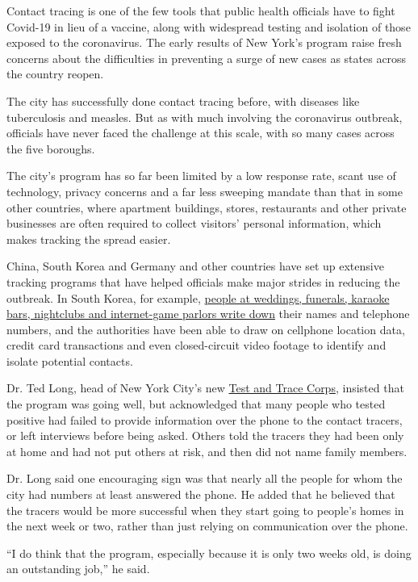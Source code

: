 Contact tracing is one of the few tools that public health officials
have to fight Covid-19 in lieu of a vaccine, along with widespread
testing and isolation of those exposed to the coronavirus. The early
results of New York's program raise fresh concerns about the
difficulties in preventing a surge of new cases as states across the
country reopen.

The city has successfully done contact tracing before, with diseases
like tuberculosis and measles. But as with much involving the
coronavirus outbreak, officials have never faced the challenge at this
scale, with so many cases across the five boroughs.

The city's program has so far been limited by a low response rate, scant
use of technology, privacy concerns and a far less sweeping mandate than
that in some other countries, where apartment buildings, stores,
restaurants and other private businesses are often required to collect
visitors' personal information, which makes tracking the spread easier.

China, South Korea and Germany and other countries have set up extensive
tracking programs that have helped officials make major strides in
reducing the outbreak. In South Korea, for example,
\href{https://www.nytimes3xbfgragh.onion/2020/05/09/world/asia/coronavirus-south-korea-second-wave.html}{people
at weddings, funerals, karaoke bars, nightclubs and internet-game
parlors write down} their names and telephone numbers, and the
authorities have been able to draw on cellphone location data, credit
card transactions and even closed-circuit video footage to identify and
isolate potential contacts.

Dr. Ted Long, head of New York City's new
\href{https://www.nychealthandhospitals.org/test-and-trace/}{Test and
Trace Corps}, insisted that the program was going well, but acknowledged
that many people who tested positive had failed to provide information
over the phone to the contact tracers, or left interviews before being
asked. Others told the tracers they had been only at home and had not
put others at risk, and then did not name family members.

Dr. Long said one encouraging sign was that nearly all the people for
whom the city had numbers at least answered the phone. He added that he
believed that the tracers would be more successful when they start going
to people's homes in the next week or two, rather than just relying on
communication over the phone.

``I do think that the program, especially because it is only two weeks
old, is doing an outstanding job,'' he said.

